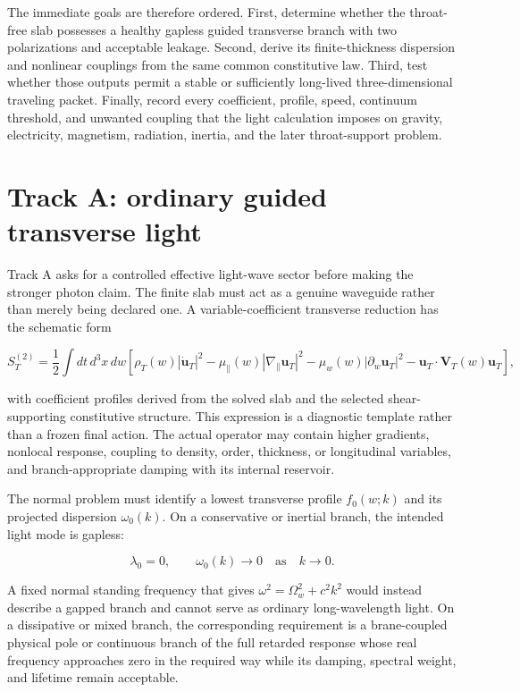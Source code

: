 The immediate goals are therefore ordered. First, determine whether the
throat-free slab possesses a healthy gapless guided transverse branch with two
polarizations and acceptable leakage. Second, derive its finite-thickness
dispersion and nonlinear couplings from the same common constitutive law. Third,
test whether those outputs permit a stable or sufficiently long-lived
three-dimensional traveling packet. Finally, record every coefficient, profile,
speed, continuum threshold, and unwanted coupling that the light calculation
imposes on gravity, electricity, magnetism, radiation, inertia, and the later
throat-support problem.

\section{Track A: ordinary guided transverse light}

Track A asks for a controlled effective light-wave sector before making the
stronger photon claim. The finite slab must act as a genuine waveguide rather
than merely being declared one. A variable-coefficient transverse reduction has
the schematic form

\[
S_T^{(2)}
=
\frac12\int dt\,d^3x\,dw
\left[
\rho_T(w)|\dot{\mathbf u}_T|^2
-\mu_\parallel(w)|\nabla_\parallel\mathbf u_T|^2
-\mu_w(w)|\partial_w\mathbf u_T|^2
-\mathbf u_T\!\cdot\!\mathbf V_T(w)\mathbf u_T
\right],
\]

with coefficient profiles derived from the solved slab and the selected
shear-supporting constitutive structure. This expression is a diagnostic
template rather than a frozen final action. The actual operator may contain
higher gradients, nonlocal response, coupling to density, order, thickness, or
longitudinal variables, and branch-appropriate damping with its internal
reservoir.

The normal problem must identify a lowest transverse profile \(f_0(w;k)\) and
its projected dispersion \(\omega_0(k)\). On a conservative or inertial branch,
the intended light mode is gapless:

\[
\lambda_0=0,
\qquad
\omega_0(k)\longrightarrow0
\quad\text{as}\quad k\longrightarrow0.
\]

A fixed normal standing frequency that gives
\(\omega^2=\Omega_w^2+c^2k^2\) would instead describe a gapped branch and cannot
serve as ordinary long-wavelength light. On a dissipative or mixed branch, the
corresponding requirement is a brane-coupled physical pole or continuous branch
of the full retarded response whose real frequency approaches zero in the
required way while its damping, spectral weight, and lifetime remain
acceptable.

